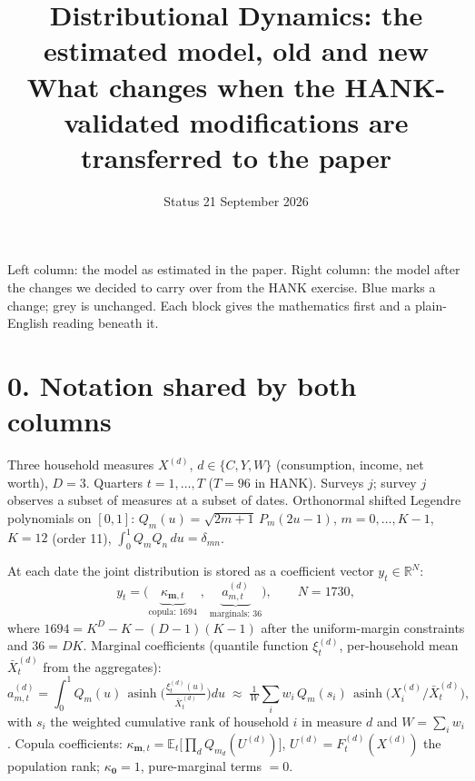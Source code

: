 \documentclass[10pt,a4paper]{article}
\title{\vspace{-1.2cm}Distributional Dynamics: the estimated model, old and new\\[2pt]\large What changes when the HANK-validated modifications are transferred to the paper}
\author{}
\date{Status 21 September 2026}
\newcommand{\E}{\mathbb{E}}
\newcommand{\R}{\mathbb{R}}
\newcommand{\asinh}{\operatorname{asinh}}
\begin{document}
\maketitle
\vspace{-1cm}

\begin{center}\small
Left column: the model as estimated in the paper. Right column: the model after the changes we decided to carry over from the HANK exercise.
Blue marks a change; grey is unchanged. Each block gives the mathematics first and a plain-English reading beneath it.
\end{center}

\section*{0. Notation shared by both columns}
Three household measures $X^{(d)}$, $d\in\{C,Y,W\}$ (consumption, income, net worth), $D=3$. Quarters $t=1,\dots,T$ ($T=96$ in HANK). Surveys $j$; survey $j$ observes a subset of measures at a subset of dates.
Orthonormal shifted Legendre polynomials on $[0,1]$: $Q_m(u)=\sqrt{2m+1}\,P_m(2u-1)$, $m=0,\dots,K-1$, $K=12$ (order 11), $\int_0^1 Q_mQ_n\,du=\delta_{mn}$.

At each date the joint distribution is stored as a coefficient vector $y_t\in\R^N$:
\[
y_t=\big(\underbrace{\kappa_{\mathbf m,t}}_{\text{copula: }1694}\;,\;\underbrace{a^{(d)}_{m,t}}_{\text{marginals: }36}\big),\qquad N=1730,
\]
where $1694=K^D-K-(D-1)(K-1)$ after the uniform-margin constraints and $36=DK$.
Marginal coefficients (quantile function $\xi^{(d)}_t$, per-household mean $\bar X^{(d)}_t$ from the aggregates):
\[
a^{(d)}_{m,t}=\int_0^1 Q_m(u)\,\asinh\!\Big(\tfrac{\xi^{(d)}_t(u)}{\bar X^{(d)}_t}\Big)du
\;\approx\;\tfrac{1}{W}\textstyle\sum_i w_i\,Q_m(s_i)\,\asinh\!\big(X^{(d)}_i/\bar X^{(d)}_t\big),
\]
with $s_i$ the weighted cumulative rank of household $i$ in measure $d$ and $W=\sum_i w_i$.
Copula coefficients: $\kappa_{\mathbf m,t}=\E_t\big[\prod_d Q_{m_d}(U^{(d)})\big]$, $U^{(d)}=F^{(d)}_t(X^{(d)})$ the population rank; $\kappa_{\mathbf 0}=1$, pure-marginal terms $=0$.
\end{document}

